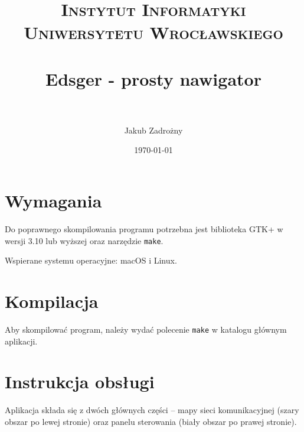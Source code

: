 \documentclass[paper=a4, fontsize=11pt]{scrartcl} %
\title{
\normalfont \normalsize
\textsc{Instytut Informatyki Uniwersytetu Wrocławskiego} \\ [25pt] %
\horrule{0.5pt} \\[0.4cm] %
\huge Edsger - prosty nawigator \\ %
\horrule{0.5pt} \\[0.4cm] %
}
\author{Jakub Zadrożny} %
\date{\normalsize\today} %
\begin{document}

\maketitle %

\section{Wymagania}
Do poprawnego skompilowania programu potrzebna jest biblioteka GTK+ w wersji 3.10 lub wyższej oraz narzędzie \texttt{make}.

\noindent Wspierane systemu operacyjne: macOS i Linux.
\section{Kompilacja}
Aby skompilować program, należy wydać polecenie \texttt{make} w katalogu głównym aplikacji.
\section{Instrukcja obsługi}
Aplikacja składa się z dwóch głównych części -- mapy sieci komunikacyjnej
(szary obszar po lewej stronie) oraz panelu sterowania (biały obszar po prawej stronie).
\end{document}
